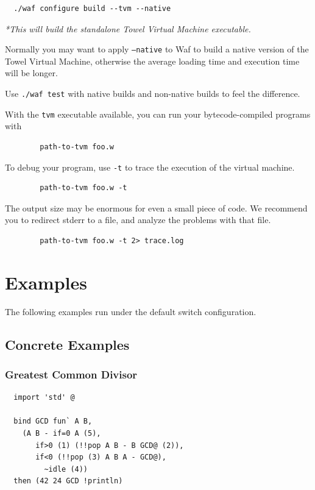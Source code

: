\documentclass{report}
\begin{document}
\begin{mdframed}[style=example]
\begin{verbatim}
  ./waf configure build --tvm --native
\end{verbatim}

\textit{*This will build the standalone Towel Virtual Machine executable.}
\end{mdframed}

\begin{mdframed}[style=hint]
  Normally you may want to apply \texttt{--native} to Waf to build a native version of the Towel Virtual Machine, otherwise the average loading time and execution time will be longer.

  Use \texttt{./waf test} with native builds and non-native builds to feel the difference.
\end{mdframed}

With the \texttt{tvm} executable available, you can run your bytecode-compiled programs with
\begin{verbatim}
        path-to-tvm foo.w
\end{verbatim}

To debug your program, use \texttt{-t} to trace the execution of the virtual machine.
\begin{verbatim}
        path-to-tvm foo.w -t
\end{verbatim}

\begin{mdframed}[style=hint]
  The output size may be enormous for even a small piece of code. We recommend you to redirect stderr to a file, and analyze the problems with that file.
\begin{verbatim}
        path-to-tvm foo.w -t 2> trace.log
\end{verbatim}
\end{mdframed}

\chapter{Examples}
\label{chap:examples}

The following examples run under the default switch configuration.

\section{Concrete Examples}

\subsection{Greatest Common Divisor}
\begin{mdframed}[style=example]
\begin{verbatim}
  import 'std' @

  bind GCD fun` A B,
    (A B - if=0 A (5),
       if>0 (1) (!!pop A B - B GCD@ (2)),
       if<0 (!!pop (3) A B A - GCD@),
         ~idle (4))
  then (42 24 GCD !println)
\end{verbatim}
\end{mdframed}
\end{document}
